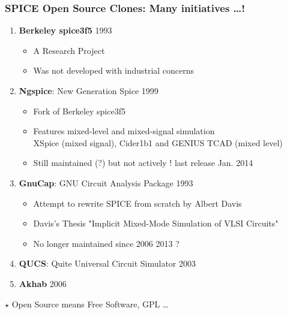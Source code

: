 
\begin{frame}
  \frametitle{SPICE Open Source Clones: Many initiatives \ldots !}
  \begin{enumerate}
  \item \textbf{Berkeley spice3f5} \alert{1993} %
    \begin{itemize}
    \item A Research Project
    \item \alert{Was not developed with industrial concerns}
    \end{itemize}
  \item \textbf{Ngspice}: New Generation Spice \alert{1999}
    \begin{itemize}
    \item \alert{Fork of Berkeley spice3f5}
    \item Features mixed-level and mixed-signal simulation \\
      XSpice (mixed signal), Cider1b1 and GENIUS TCAD (mixed level)
    \item \alert{Still maintained (?) but not actively !} {\tiny last release Jan. 2014}
    \end{itemize}
  \item \textbf{GnuCap}: GNU Circuit Analysis Package \alert{1993}
    \begin{itemize}
    \item Attempt to rewrite SPICE from scratch by Albert Davis
    \item Davis's Thesis "Implicit Mixed-Mode Simulation of VLSI Circuits"
    \item No longer maintained since 2006 {\tiny 2013 ?}
    \end{itemize}
  \item \textbf{QUCS}: Quite Universal Circuit Simulator \alert{2003}
  \item \textbf{Akhab} \alert{2006}
  \end{enumerate}
  \begin{flushright}
    \tiny $\star$ Open Source means Free Software, GPL \ldots
  \end{flushright}
\end{frame}

